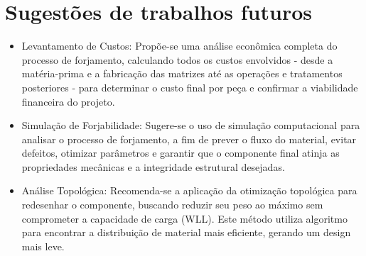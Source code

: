 \chapter{Sugestões de trabalhos futuros}\label{Sugestões de trabalhos futuros}

\begin{itemize}

\item Levantamento de Custos: Propõe-se uma análise econômica completa do processo de forjamento, calculando todos os custos envolvidos - desde a matéria-prima e a fabricação das matrizes até as operações e tratamentos posteriores - para determinar o custo final por peça e confirmar a viabilidade financeira do projeto.
\item Simulação de Forjabilidade: Sugere-se o uso de simulação computacional para analisar o processo de forjamento, a fim de prever o fluxo do material, evitar defeitos, otimizar parâmetros e garantir que o componente final atinja as propriedades mecânicas e a integridade estrutural desejadas.
\item Análise Topológica: Recomenda-se a aplicação da otimização topológica para redesenhar o componente, buscando reduzir seu peso ao máximo sem comprometer a capacidade de carga (WLL). Este método utiliza algoritmo para encontrar a distribuição de material mais eficiente, gerando um design mais leve.

\end{itemize}